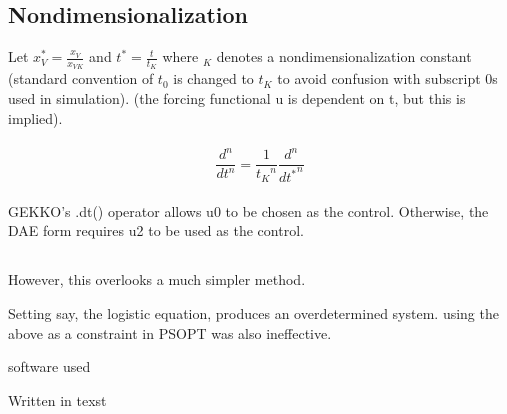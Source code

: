 \documentclass[fleqn,10pt]{paper}
\newcommand{\bstar}[1]{ {#1}^{\bm*} }
\begin{document}

\subsection*{Nondimensionalization}

Let $x_V^{\bm*} = \frac{x_V}{x_{VK}}$ and $t^{\bm*} = \frac{t}{t_{K}}$ where $_K$ denotes a nondimensionalization constant (standard convention of $t_0$ is changed to $t_K$ to avoid confusion with subscript 0s used in simulation). (the forcing functional u is dependent on t, but this is implied).\\ \\

$$\frac{d^n}{dt^n} = \frac{1}{{t_K}^n}\frac{d^n}{d{\bstar{t}}^n}$$\\







GEKKO's .dt() operator allows u0 to be chosen as the control. 
Otherwise, the DAE form requires u2 to be used as the control.



\subsection*{}


However, this overlooks a much simpler method.

Setting say, the logistic equation, produces an overdetermined system. using the above as a constraint in PSOPT was also ineffective.


software used

Written in texst
\end{document}
